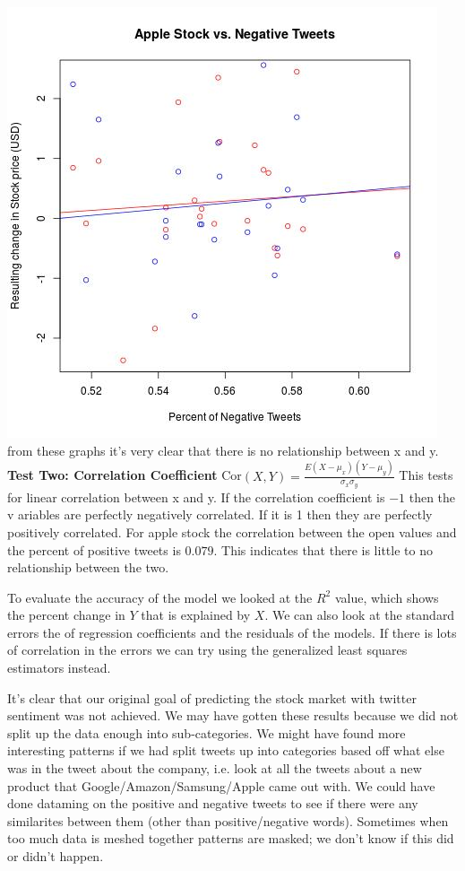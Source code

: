 \documentclass{acm_proc_article-sp}
\begin{document}
\begin{doublespace}
\newline\includegraphics[scale=.5]{apple_negative.jpeg} 
\newline\indent from these graphs it's very clear that there is no relationship between x and y. 
\newline\newline\textbf{Test Two: Correlation Coefficient}
\newline\indent Cor$(X,Y) = \frac{E ( X - \mu_x)(Y - \mu_y)}{\sigma_x\sigma_y}$
\newline\indent This tests for linear correlation between x and y. If the correlation coefficient is $-1$ then the v
ariables are perfectly negatively correlated. If it is 1 then they are perfectly positively correlated.
\newline\indent For apple stock the correlation between the open values and the percent of positive tweets is $0.079
$. This indicates that there is little to no relationship between the two. 

To evaluate the accuracy of the model we looked at the $R^2$ value, which shows
the percent change in $Y$ that is explained by $X$. We can also look at the
standard errors the of regression coefficients and the residuals of the models.
If there is lots of correlation in the errors we can try using the generalized
least squares estimators instead. 

It's clear that our original goal of predicting the stock market with twitter sentiment 
was not achieved. We may have gotten these results because we did not split up the data 
enough into sub-categories. We might have found more interesting patterns if we had split tweets
up into categories based off what else was in the tweet about the company, i.e. look at all the
tweets about a new product that Google/Amazon/Samsung/Apple came out with. We could have done dataming
on the positive and negative tweets to see if there were any similarites between them (other 
than positive/negative words). Sometimes when too much data is meshed together patterns are masked;
we don't know if this did or didn't happen. 


\end{doublespace}
\end{document}
